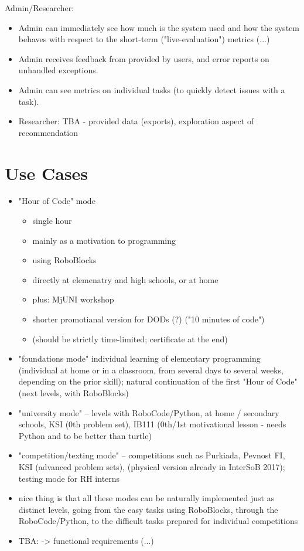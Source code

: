 Admin/Researcher:
\begin{itemize}
\item Admin can immediately see how much is the system used and how the system behaves with respect to the short-term ("live-evaluation") metrics (...)
\item Admin receives feedback from provided by users, and error reports on unhandled exceptions.
\item Admin can see metrics on individual tasks (to quickly detect issues with a task).
\item Researcher: TBA - provided data (exports), exploration aspect of recommendation
\end{itemize}




\section{Use Cases}
\label{sec:robomission.use-cases}

\begin{itemize}
\item "Hour of Code" mode
  \begin{itemize}
  \item single hour
  \item mainly as a motivation to programming
  \item using RoboBlocks
  \item directly at elemenatry and high schools, or at home
  \item plus: MjUNI workshop
  \item shorter promotianal version for DODs (?) ("10 minutes of code")
  \item (should be strictly time-limited; certificate at the end)
  \end{itemize}
\item "foundations mode" individual learning of elementary programming (individual at home or in a classroom, from several days to several weeks, depending on the prior skill); natural continuation of the first "Hour of Code" (next levels, with RoboBlocks)
\item "university mode" -- levels with RoboCode/Python, at home / secondary schools, KSI (0th problem set), IB111 (0th/1st motivational lesson - needs Python and to be better than turtle)
\item "competition/texting mode" -- competitions such as Purkiada, Pevnost FI, KSI (advanced problem sets), (physical version already in InterSoB 2017); testing mode for RH interns
\item nice thing is that all these modes can be naturally implemented just as distinct levels, going from the easy tasks using RoboBlocks, through the RoboCode/Python, to the difficult tasks prepared for individual competitions
\item TBA: -> functional requirements (...)
\end{itemize}




